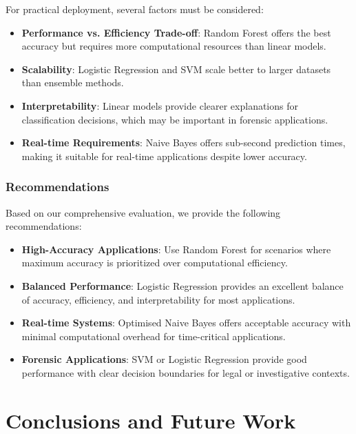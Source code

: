 \documentclass[11pt,a4paper]{article}
\begin{document}
For practical deployment, several factors must be considered:

\begin{itemize}
    \item \textbf{Performance vs. Efficiency Trade-off}: Random Forest offers the best accuracy but requires more computational resources than linear models.
    
    \item \textbf{Scalability}: Logistic Regression and SVM scale better to larger datasets than ensemble methods.
    
    \item \textbf{Interpretability}: Linear models provide clearer explanations for classification decisions, which may be important in forensic applications.
    
    \item \textbf{Real-time Requirements}: Naive Bayes offers sub-second prediction times, making it suitable for real-time applications despite lower accuracy.
\end{itemize}

\subsubsection{Recommendations}

Based on our comprehensive evaluation, we provide the following recommendations:

\begin{itemize}
    \item \textbf{High-Accuracy Applications}: Use Random Forest for scenarios where maximum accuracy is prioritized over computational efficiency.
    
    \item \textbf{Balanced Performance}: Logistic Regression provides an excellent balance of accuracy, efficiency, and interpretability for most applications.
    
    \item \textbf{Real-time Systems}: Optimised Naive Bayes offers acceptable accuracy with minimal computational overhead for time-critical applications.
    
    \item \textbf{Forensic Applications}: SVM or Logistic Regression provide good performance with clear decision boundaries for legal or investigative contexts.
\end{itemize}

\section{Conclusions and Future Work}
\end{document}
